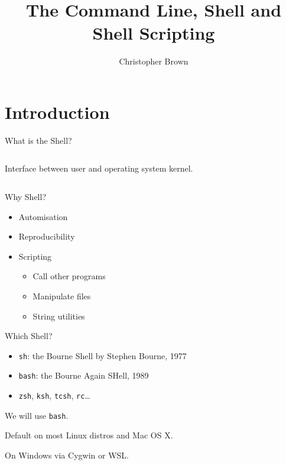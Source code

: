 \documentclass[pdf,usenames,dvipsnames,14pt]{beamer}%
\title[Command Line \& Shell]{The Command Line, Shell and Shell Scripting}
\author{Christopher Brown}
\date{}
\begin{document}
\begin{frame}
	\titlepage
\end{frame}

\section{Introduction}

\begin{frame}{What is the Shell?}
	\begin{columns}[t]
		Interface between user and operating system kernel.
	\end{columns}
\end{frame}

\begin{frame}{Why Shell?}
	\begin{itemize}
		\item Automisation
		\item Reproducibility
		\item Scripting
		\begin{itemize}
			\item Call other programs
			\item Manipulate files
			\item String utilities
		\end{itemize}
	\end{itemize}
\end{frame}

\begin{frame}{Which Shell?}
	\begin{itemize}
		\item \texttt{sh}: the Bourne Shell by Stephen Bourne, 1977
		\item \texttt{bash}: the Bourne Again SHell, 1989
		\item \texttt{zsh}, \texttt{ksh}, \texttt{tcsh}, \texttt{rc}\dots
	\end{itemize}
	We will use \texttt{bash}.
	
	Default on most Linux distros and Mac OS X.
	
	On Windows via Cygwin or WSL.
\end{frame}
\end{document}
